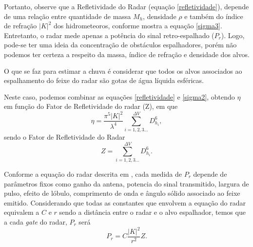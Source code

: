 Portanto, observe que a Refletividade do Radar (equação  \ref{refletividade}), depende  de uma relação entre quantidade de massa $M_h$, densidade $\rho$ e também do índice de refração $|K|^2$ dos hidrometeoros, conforme mostra a equação \ref{sigma3}. Entretanto, o radar mede apenas a potência do sinal retro-espalhado ($P_r$). Logo, pode-se ter uma ideia da concentração de obstáculos espalhadores, porém não podemos ter certeza a respeito da massa, índice de refração e densidade dos alvos. 


O que se faz para estimar a chuva é considerar que todos os alvos associados ao espalhamento do feixe do radar são gotas de água líquida esféricas. 

Neste caso, podemos combinar as equações \ref{refletividade} e \ref{sigma2}, obtendo $\eta$ em função do Fator de Refletividade  do radar (Z), em que 
\begin{equation}
\eta =  \dfrac{\pi^5 |K|^2  }{ \lambda^4 } \sum_{i=1, 2, 3 ... }^{\Delta V} D_{h_i}^6,
\end{equation}
sendo o Fator de Refletividade do Radar
\begin{equation}
Z =  \sum_{i=1, 2, 3 ... }^{\Delta V}  D_{h_i}^6.
\label{fz}
\end{equation}


Conforme a equação do radar descrita em , cada medida de $P_r$ depende de parâmetros fixos como ganho da antena, potencia do sinal transmitido, largura de pulso, efeito de lóbulo, comprimento de onda e ângulo sólido associado ao feixe emitido. Considerando que todas as constantes que envolvem a equação do radar equivalem a $C$ e $r$ sendo a distância entre o radar e o alvo espalhador, temos que a cada \textit{gate} do radar, $P_r$ será  
\begin{equation}
P_r = C \dfrac{|K|^2}{r^2}  Z .
\end{equation}

